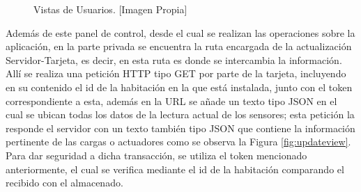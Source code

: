 \begin{figure}[p]
	\centering
	\caption[Vistas de Usuarios.]{Vistas de Usuarios. [Imagen Propia]}
	\label{fig:views}
\end{figure}

Además de este panel de control, desde el cual se realizan las operaciones sobre la aplicación, en la parte privada se encuentra la ruta encargada de la actualización Servidor-Tarjeta, es decir, en esta ruta es donde se intercambia la información. Allí se realiza una petición HTTP tipo GET por parte de la tarjeta, incluyendo en su contenido el id de la habitación en la que está instalada, junto con el token correspondiente a esta, además en la URL se añade un texto tipo JSON en el cual se ubican todas los datos de la lectura actual de los sensores; esta petición la responde el servidor con un texto también tipo JSON que contiene la información pertinente de las cargas o actuadores como se observa la Figura \ref{fig:updateview}. Para dar seguridad a dicha transacción, se utiliza el token mencionado anteriormente, el cual se verifica mediante el id de la habitación comparando el recibido con el almacenado.\\

